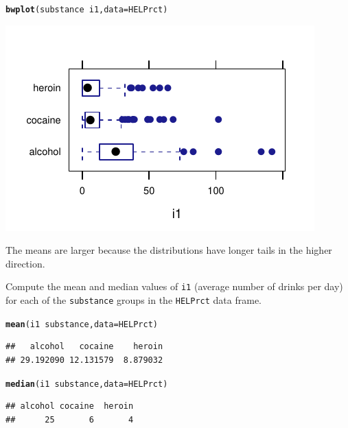 \documentclass[twoside]{book}\usepackage[]{graphicx}\usepackage[]{xcolor}
\makeatletter
\def\maxwidth{ %
  \ifdim\Gin@nat@width>\linewidth
    \linewidth
  \else
    \Gin@nat@width
  \fi
}
\newcommand{\hlopt}[1]{\textcolor[rgb]{0,0,0}{#1}}%
\newcommand{\hlstd}[1]{\textcolor[rgb]{0.345,0.345,0.345}{#1}}%
\newcommand{\hlkwc}[1]{\textcolor[rgb]{0.333,0.667,0.333}{#1}}%
\newcommand{\hlkwd}[1]{\textcolor[rgb]{0.737,0.353,0.396}{\textbf{#1}}}%
\newenvironment{kframe}{%
 \def\at@end@of@kframe{}%
 \ifinner\ifhmode%
  \def\at@end@of@kframe{\end{minipage}}%
  \begin{minipage}{\columnwidth}%
 \fi\fi%
 \def\FrameCommand##1{\hskip\@totalleftmargin \hskip-\fboxsep
 \colorbox{shadecolor}{##1}\hskip-\fboxsep
     \hskip-\linewidth \hskip-\@totalleftmargin \hskip\columnwidth}%
 \MakeFramed {\advance\hsize-\width
   \@totalleftmargin\z@ \linewidth\hsize
   \@setminipage}}%
 {\par\unskip\endMakeFramed%
 \at@end@of@kframe}
\newenvironment{knitrout}{}{} %
\newcommand{\variable}[1]{{\color{green!50!black}\texttt{#1}}}
\newcommand{\Rindex}[1]{\index{\texttt{#1}}}
\newcommand{\dataframe}[1]{{\color{blue!80!black}\texttt{#1}}\Rindex{#1}}
\makeatother
\begin{document}
\begin{solution}
\begin{knitrout}
\color{fgcolor}\begin{kframe}
\begin{alltt}
\hlkwd{bwplot}\hlstd{(substance} \hlopt{~} \hlstd{i1,} \hlkwc{data} \hlstd{= HELPrct)}
\end{alltt}
\end{kframe}

{\centering \includegraphics[width=\maxwidth]{figures/fig-unnamed-chunk-41-1} 

}



\end{knitrout}
	The means are larger because the distributions have longer tails in the 
	higher direction.  
\end{solution}

\begin{problem}
	Compute the mean and median values of \variable{i1} (average number of
	drinks per day) for each of the \variable{substance} groups in the 
	\dataframe{HELPrct} data frame.
\end{problem}

\begin{solution}
\begin{knitrout}
\color{fgcolor}\begin{kframe}
\begin{alltt}
\hlkwd{mean}\hlstd{(i1} \hlopt{~} \hlstd{substance,} \hlkwc{data} \hlstd{= HELPrct)}
\end{alltt}
\begin{verbatim}
##   alcohol   cocaine    heroin 
## 29.192090 12.131579  8.879032
\end{verbatim}
\begin{alltt}
\hlkwd{median}\hlstd{(i1} \hlopt{~} \hlstd{substance,} \hlkwc{data} \hlstd{= HELPrct)}
\end{alltt}
\begin{verbatim}
## alcohol cocaine  heroin 
##      25       6       4
\end{verbatim}
\end{kframe}
\end{knitrout}
\end{solution}
\end{document}
